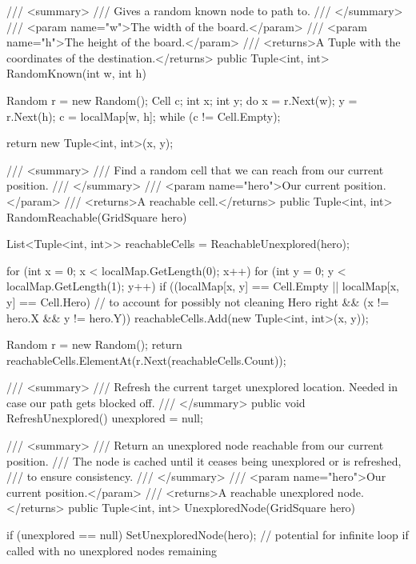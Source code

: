 \documentclass[11pt]{article}
\begin{document}
\begin{code}
{{        /// <summary>
        /// Gives a random known node to path to.
        /// </summary>
        /// <param name="w">The width of the board.</param>
        /// <param name="h">The height of the board.</param>
        /// <returns>A Tuple with the coordinates of the destination.</returns>
        public Tuple<int, int> RandomKnown(int w, int h)
        {
            Random r = new Random();
            Cell c;
            int x;
            int y;
            do
            {
                x = r.Next(w);
                y = r.Next(h);
                c = localMap[w, h];
            } while (c != Cell.Empty);

            return new Tuple<int, int>(x, y);
        }

        /// <summary>
        /// Find a random cell that we can reach from our current position.
        /// </summary>
        /// <param name="hero">Our current position.</param>
        /// <returns>A reachable cell.</returns>
        public Tuple<int, int> RandomReachable(GridSquare hero)
        {
            List<Tuple<int, int>> reachableCells = ReachableUnexplored(hero);

            for (int x = 0; x < localMap.GetLength(0); x++)
            {
                for (int y = 0; y < localMap.GetLength(1); y++)
                {
                    if ((localMap[x, y] == Cell.Empty || localMap[x, y] == Cell.Hero) // to account for possibly not cleaning Hero right
                        && (x != hero.X && y != hero.Y))
                    {
                        reachableCells.Add(new Tuple<int, int>(x, y));
                    }
                }
            }

            Random r = new Random();
            return reachableCells.ElementAt(r.Next(reachableCells.Count));
        }

        /// <summary>
        /// Refresh the current target unexplored location. Needed in case our path gets blocked off.
        /// </summary>
        public void RefreshUnexplored()
        {
            unexplored = null;
        }

        /// <summary>
        /// Return an unexplored node reachable from our current position.
        /// The node is cached until it ceases being unexplored or is refreshed,
        /// to ensure consistency.
        /// </summary>
        /// <param name="hero">Our current position.</param>
        /// <returns>A reachable unexplored node.</returns>
        public Tuple<int, int> UnexploredNode(GridSquare hero)
        {
            if (unexplored == null)
            {
                SetUnexploredNode(hero); // potential for infinite loop if called with no unexplored nodes remaining
            }

}}}
\end{code}
\end{document}
